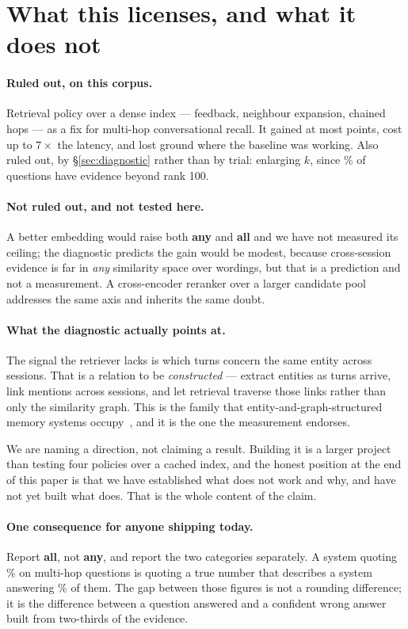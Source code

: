 \section{What this licenses, and what it does not}
\label{sec:implications}

\paragraph{Ruled out, on this corpus.}
Retrieval policy over a dense index --- feedback, neighbour expansion, chained
hops --- as a fix for multi-hop conversational recall. It gained at most
\rBestDelta{} points, cost up to $7\times$ the latency, and lost ground where the
baseline was working. Also ruled out, by \S\ref{sec:diagnostic} rather than by
trial: enlarging $k$, since \rBeyondHundred{}\% of questions have evidence beyond
rank 100.

\paragraph{Not ruled out, and not tested here.}
A better embedding would raise both \textbf{any} and \textbf{all} and we have not
measured its ceiling; the diagnostic predicts the gain would be modest, because
cross-session evidence is far in \emph{any} similarity space over wordings, but
that is a prediction and not a measurement. A cross-encoder reranker over a
larger candidate pool addresses the same axis and inherits the same doubt.

\paragraph{What the diagnostic actually points at.}
The signal the retriever lacks is which turns concern the same entity across
sessions. That is a relation to be \emph{constructed} --- extract entities as
turns arrive, link mentions across sessions, and let retrieval traverse those
links rather than only the similarity graph. This is the family that
entity-and-graph-structured memory systems occupy~\cite{hipporag}, and it is the
one the measurement endorses.

We are naming a direction, not claiming a result. Building it is a larger project
than testing four policies over a cached index, and the honest position at the
end of this paper is that we have established what does not work and why, and
have not yet built what does. That is the whole content of the claim.

\paragraph{One consequence for anyone shipping today.}
Report \textbf{all}, not \textbf{any}, and report the two categories separately.
A system quoting \rManyTwenty{}\% on multi-hop questions is quoting a true number
that describes a system answering \rMallTwenty{}\% of them. The gap between those
figures is not a rounding difference; it is the difference between a question
answered and a confident wrong answer built from two-thirds of the evidence.
